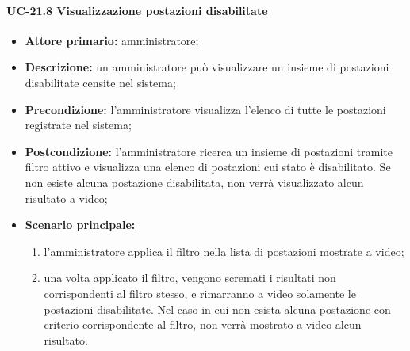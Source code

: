 \paragraph{UC-21.8 Visualizzazione postazioni disabilitate}
\begin{itemize}
    \item \textbf{Attore primario:} amministratore;
    \item \textbf{Descrizione:} un amministratore pu\`{o} visualizzare un insieme di postazioni disabilitate censite nel sistema;
    \item \textbf{Precondizione:} l'amministratore visualizza l'elenco di tutte le postazioni registrate nel sistema;
    \item \textbf{Postcondizione:} l'amministratore ricerca un insieme di postazioni tramite filtro attivo e visualizza una elenco di postazioni cui stato è disabilitato. Se non esiste alcuna postazione disabilitata, non verrà visualizzato alcun risultato a video;
    \item \textbf{Scenario principale:}
    \begin{enumerate}
        \item l'amministratore applica il filtro nella lista di postazioni mostrate a video;
        \item una volta applicato il filtro, vengono scremati i risultati non corrispondenti al filtro stesso, e rimarranno a video solamente le postazioni disabilitate. Nel caso in cui non esista alcuna postazione con criterio corrispondente al filtro, non verrà mostrato a video alcun risultato.
    \end{enumerate}
\end{itemize}
    

